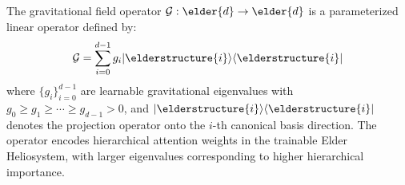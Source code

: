 \begin{definition}
The gravitational field operator $\mathcal{G}: \elder{d} \rightarrow \elder{d}$ is a parameterized linear operator defined by:
\begin{equation}
\mathcal{G} = \sum_{i=0}^{d-1} g_i |\elderstructure{i}\rangle\langle\elderstructure{i}|
\end{equation}
where $\{g_i\}_{i=0}^{d-1}$ are learnable gravitational eigenvalues with $g_0 \geq g_1 \geq \cdots \geq g_{d-1} > 0$, and $|\elderstructure{i}\rangle\langle\elderstructure{i}|$ denotes the projection operator onto the $i$-th canonical basis direction. The operator encodes hierarchical attention weights in the trainable Elder Heliosystem, with larger eigenvalues corresponding to higher hierarchical importance.
\end{definition}

